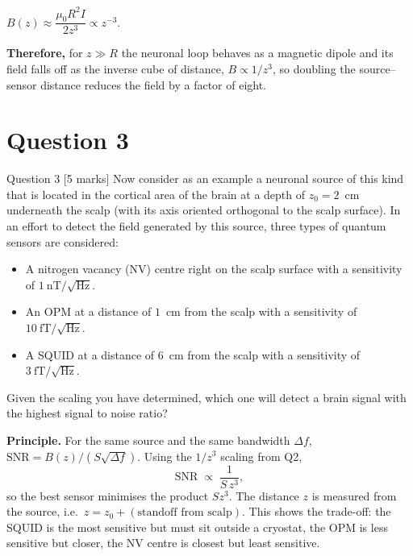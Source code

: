 \documentclass[11pt]{article}
\newcommand{\closing}[1]{\par\medskip\noindent\textbf{Therefore,} #1}
\begin{document}
\begin{answerbox}
$B(z)\approx \dfrac{\mu_0 R^2 I}{2z^3}\propto z^{-3}$.
\closing{for $z\gg R$ the neuronal loop behaves as a magnetic dipole and its field falls off as the
inverse cube of distance, $B\propto 1/z^3$, so doubling the source--sensor distance reduces the
field by a factor of eight.}
\end{answerbox}

\section{Question 3}

\begin{problembox}{Question 3 \hfill [5 marks]}
Now consider as an example a neuronal source of this kind that is located in the cortical area of
the brain at a depth of $z_0 = 2$~cm underneath the scalp (with its axis oriented orthogonal to the
scalp surface). In an effort to detect the field generated by this source, three types of quantum
sensors are considered:
\begin{itemize}[nosep]
\item A nitrogen vacancy (NV) centre right on the scalp surface with a sensitivity of $1~\mathrm{nT}/\sqrt{\mathrm{Hz}}$.
\item An OPM at a distance of $1$~cm from the scalp with a sensitivity of $10~\mathrm{fT}/\sqrt{\mathrm{Hz}}$.
\item A SQUID at a distance of $6$~cm from the scalp with a sensitivity of $3~\mathrm{fT}/\sqrt{\mathrm{Hz}}$.
\end{itemize}
Given the scaling you have determined, which one will detect a brain signal with the highest
signal to noise ratio?
\end{problembox}

\textbf{Principle.} For the same source and the same bandwidth $\Delta f$,
$\mathrm{SNR} = B(z)/(S\sqrt{\Delta f})$. Using the $1/z^3$ scaling from Q2,
\[ \mathrm{SNR}\;\propto\;\frac{1}{S\,z^3}, \]
so the best sensor minimises the product $S z^3$. The distance $z$ is measured from the source,
i.e.\ $z = z_0 + (\text{standoff from scalp})$. This shows the trade-off: the SQUID is the most
sensitive but must sit outside a cryostat, the OPM is less sensitive but closer, the NV centre is
closest but least sensitive.
\end{document}
